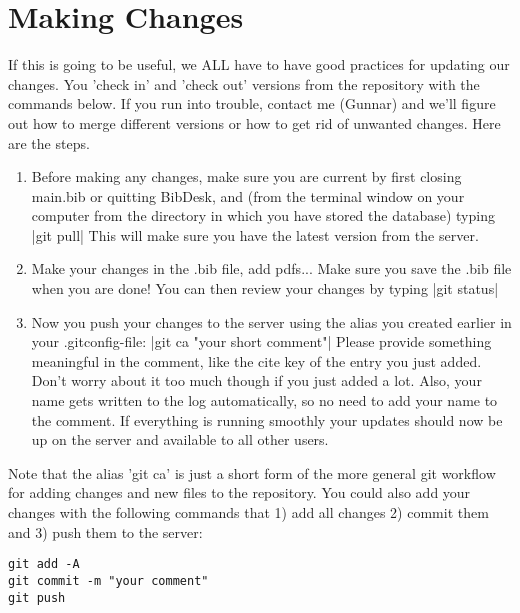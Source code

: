 \documentclass[11pt, oneside]{article}   	%
\begin{document}
\section{Making Changes}

If this is going to be useful, we ALL have to have good practices for updating our changes. You 'check in' and 'check out' versions from the repository with the commands below. If you run into trouble, contact me (Gunnar) and we'll figure out how to merge different versions or how to get rid of unwanted changes.  
	Here are the steps. 
	
\begin{enumerate}
\item Before making any changes, make sure you are current by first closing main.bib or quitting BibDesk, and (from the terminal window on your computer from the directory in which you have stored the database) typing
|git pull|
This will make sure you have the latest version from the server.

\item Make your changes in the .bib file, add pdfs... Make sure you save the .bib file when you are done! You can then review your changes by typing
|git status|

\item Now you push your changes to the server using the alias you created earlier in your .gitconfig-file:
|git ca "your short comment"|
Please provide something meaningful in the comment, like the cite key of the entry you just added. Don't worry about it too much though if you just added a lot. Also, your name gets written to the log automatically, so no need to add your name to the comment. If everything is running smoothly your updates should now be up on the server and available to all other users.

\end{enumerate}

Note that the alias 'git ca' is just a short form of the more general git workflow for adding changes and new files to the repository. You could also add your changes with the following commands that 1) add all changes 2) commit them and 3) push them to the server:
\begin{verbatim}
git add -A
git commit -m "your comment"
git push
\end{verbatim}
\end{document}
